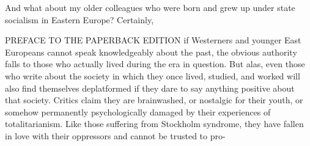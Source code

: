  \par 
And what about my older colleagues who were born and grew up under state socialism in Eastern Europe? Certainly,
 \par 
PREFACE TO THE PAPERBACK EDITION if Westerners and younger East Europeans cannot speak knowledgeably about the past, the obvious authority falls to those who actually lived during the era in question. But alas, even those who write about the society in which they once lived, studied, and worked will also find themselves deplatformed if they dare to say anything positive about that society. Critics claim they are brainwashed, or nostalgic for their youth, or somehow permanently psychologically damaged by their experiences of totalitarianism. Like those suffering from Stockholm syndrome, they have fallen in love with their oppressors and cannot be trusted to pro-
 \par 
